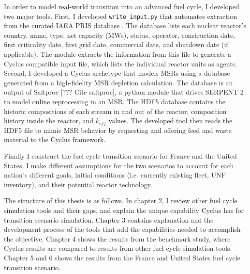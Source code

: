 In order to model real-world transition into an advanced
fuel cycle, I developed two major tools. First, I developed \texttt{write_input.py}
that automates extraction from the curated \gls{IAEA} \gls{PRIS} database
\cite{iaea_nuclear_2018}. The database lists each nuclear reactor's
country, name, type, net capacity (\gls{MWe}), status, operator, construction
date, first criticality date, first grid date, commercial date, and shutdown
date (if applicable). The module extracts the information from this file
to generate a Cyclus compatible input file, which lists the individual
reactor units as agents. Second, I developed a Cyclus archetype that models \glspl{MSR}
using a database generated from a high-fidelity \gls{MSR} depletion calculation.
The database is an output of Saltproc [??? Cite saltproc], a python
module that drives
SERPENT 2 \cite{leppanen_serpentcontinuous-energy_2013} to model online reprocessing in an \gls{MSR}.
The HDF5 database contains the historic compositions of each stream in and out of the reactor,
composition history inside the reactor, and $k_{eff}$ values. The developed tool then
reads the HDF5 file to mimic \gls{MSR} behavior by requesting and offering
feed and waste material to the Cyclus framework.

Finally I construct the fuel cycle transition scenario for France and the United States.
I make different assumptions for the two scenarios to account for each nation's different goals,
initial conditions (i.e. currently existing fleet, \gls{UNF} inventory), and their potential reactor
technology.

The structure of this thesis is as follows. In chapter 2, I review other fuel cycle simulation
tools and their gaps, and explain the unique capability Cyclus
has for transition scenario simulation.
Chapter 3 contains explanation and the development process of the tools that add the 
capabilities needed to accomplish the objective.
Chapter 4 shows the results from the benchmark study, where Cyclus results are compared
to results from other fuel cycle simulation tools.
Chapter 5 and 6 shows the results from the France and United States fuel cycle transition
scenario.

